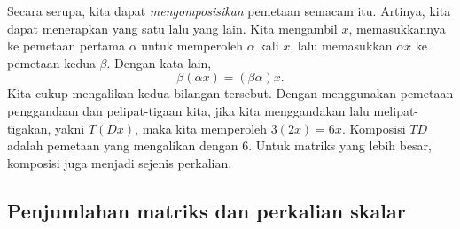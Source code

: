 Secara serupa, kita dapat \emph{mengomposisikan} pemetaan semacam itu.
Artinya, kita dapat menerapkan yang satu lalu yang lain.
Kita mengambil $x$, memasukkannya ke
pemetaan pertama $\alpha$ untuk memperoleh $\alpha$ kali $x$, lalu memasukkan
$\alpha x$ ke pemetaan kedua $\beta$. Dengan kata lain,
\begin{equation*}
\beta ( \alpha x ) = (\beta \alpha) x .
\end{equation*}
Kita cukup mengalikan kedua bilangan tersebut. Dengan menggunakan pemetaan
penggandaan dan pelipat-tigaan kita, jika kita menggandakan lalu melipat-tigakan,
yakni $T(Dx)$, maka
kita memperoleh $3(2x) = 6x$. Komposisi $TD$ adalah pemetaan yang mengalikan
dengan $6$. Untuk matriks yang lebih besar, komposisi juga menjadi sejenis
perkalian.

\subsection{Penjumlahan matriks dan perkalian skalar}

